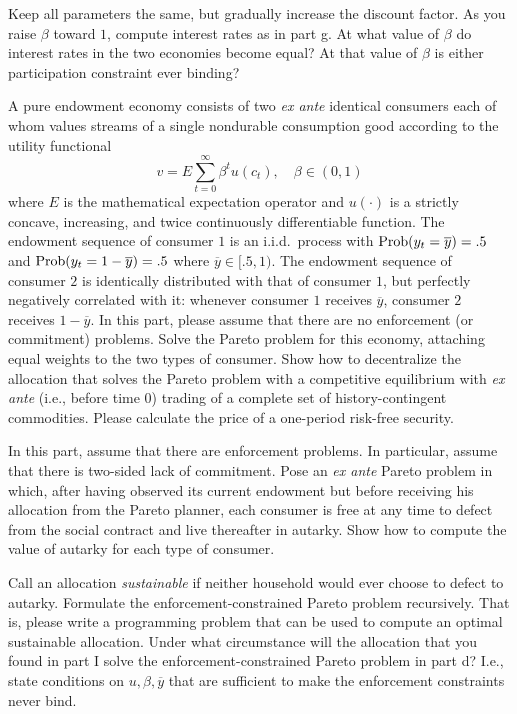 \medskip
{}   Keep all parameters the same, but gradually
increase the discount factor.   As you raise $\beta$ toward
$1$, compute interest rates
 as in part g.  At  what value of $\beta$ do interest rates
in the two economies become equal? At that value of $\beta$
is either participation constraint ever binding?


\bigskip
{} 
\medskip
\noindent A pure endowment  economy consists of two {\it
ex ante\/} identical consumers each of whom values streams of a
single nondurable consumption good according to the utility
functional
$$ v= E \sum_{t=0}^\infty \beta^t u(c_t), \quad \beta
\in (0,1)   $$ where $E$  is the mathematical expectation
operator and $u(\cdot)$ is a strictly concave, increasing, and
twice continuously differentiable function. The endowment sequence
 of consumer $1$ is an i.i.d.\ process with ${\rm Prob} (y_t =
 \overline y )=.5$ and ${\rm Prob} (y_t =
 1-\overline y )=.5$ where $\overline y \in [.5,1)$.  The
 endowment sequence of consumer $2$ is identically distributed
 with that of consumer $1$, but perfectly negatively correlated
 with it: whenever consumer $1$ receives $\overline y$, consumer
 $2$ receives $1 -\overline y$.
 \medskip
 \medskip
 \noindent In this part, please assume that
there are no enforcement (or commitment) problems.
 \medskip
  Solve the Pareto problem for this economy,
 attaching equal weights to the two types of consumer.
 \medskip
   Show how to decentralize the allocation that
 solves the Pareto problem with a competitive equilibrium with
 {\it ex ante\/} (i.e., before time $0$) trading of a complete set
 of
 history-contingent commodities. Please calculate the
 price of a one-period risk-free security.

 \medskip
 \medskip
 \noindent
In this part, assume that there are enforcement problems. In
particular, assume that there is two-sided lack of
 commitment.
 \medskip
  Pose an {\it ex ante\/} Pareto problem in which,
 after having observed its current
 endowment but before receiving his allocation from the Pareto
 planner, each
 consumer is free at any time to defect from the social contract and live thereafter in
 autarky.  Show how to compute the value of autarky for each type of consumer.

 \medskip{}
 Call an allocation {\it sustainable\/} if neither
 household would ever choose to defect to autarky.
Formulate the enforcement-constrained Pareto problem
 recursively.  That is, please write a programming problem  that can be used to
 compute an optimal sustainable allocation.
 \medskip
   Under what circumstance will the allocation
 that you found in part I solve the enforcement-constrained Pareto
 problem in part d?  I.e., state conditions on $u, \beta,
 \overline y$ that are sufficient to make the enforcement
 constraints never bind.

